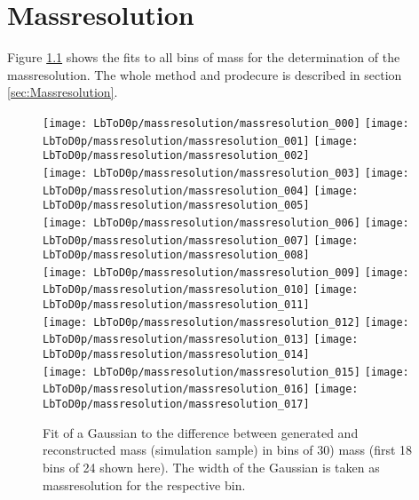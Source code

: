 \chapter{Massresolution}
Figure \ref{fig:massresolution_all} shows the fits to all bins of \Dz\proton mass for the determination of the massresolution.
The whole method and prodecure is described in section \ref{sec:Massresolution}.
\begin{figure}[hptb]
    \centering
	\texttt{[image: LbToD0p/massresolution/massresolution\_000]}
	\texttt{[image: LbToD0p/massresolution/massresolution\_001]}
	\texttt{[image: LbToD0p/massresolution/massresolution\_002]} \\
	\texttt{[image: LbToD0p/massresolution/massresolution\_003]}
	\texttt{[image: LbToD0p/massresolution/massresolution\_004]}
	\texttt{[image: LbToD0p/massresolution/massresolution\_005]} \\
	\texttt{[image: LbToD0p/massresolution/massresolution\_006]}
	\texttt{[image: LbToD0p/massresolution/massresolution\_007]}
	\texttt{[image: LbToD0p/massresolution/massresolution\_008]} \\
	\texttt{[image: LbToD0p/massresolution/massresolution\_009]}
	\texttt{[image: LbToD0p/massresolution/massresolution\_010]}
	\texttt{[image: LbToD0p/massresolution/massresolution\_011]} \\
	\texttt{[image: LbToD0p/massresolution/massresolution\_012]}
	\texttt{[image: LbToD0p/massresolution/massresolution\_013]}
	\texttt{[image: LbToD0p/massresolution/massresolution\_014]} \\
	\texttt{[image: LbToD0p/massresolution/massresolution\_015]}
	\texttt{[image: LbToD0p/massresolution/massresolution\_016]}
	\texttt{[image: LbToD0p/massresolution/massresolution\_017]} \\
	\caption{Fit of a Gaussian to the difference between generated and reconstructed \Dz\proton mass (simulation sample) in bins of 30\mev \Dz\proton) mass (first 18 bins of 24 shown here). The width of the Gaussian is taken as massresolution for the respective bin.}
    \label{fig:massresolution_all}
\end{figure}

